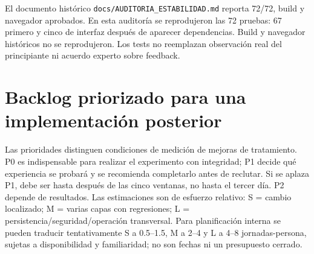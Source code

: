\documentclass[11pt,a4paper]{report}
\begin{document}
El documento histórico \nolinkurl{docs/AUDITORIA_ESTABILIDAD.md} reporta 72/72, build y navegador aprobados. En esta auditoría se reprodujeron las 72 pruebas: 67 primero y cinco de interfaz después de aparecer dependencias. Build y navegador históricos no se reprodujeron. Los tests no reemplazan observación real del principiante ni acuerdo experto sobre feedback.

\chapter{Backlog priorizado para una implementación posterior}
\label{ch:backlog}
Las prioridades distinguen condiciones de medición de mejoras de tratamiento. P0 es indispensable para realizar el experimento con integridad; P1 decide qué experiencia se probará y se recomienda completarlo antes de reclutar. Si se aplaza P1, debe ser hasta después de las cinco ventanas, no hasta el tercer día. P2 depende de resultados. Las estimaciones son de esfuerzo relativo: S = cambio localizado; M = varias capas con regresiones; L = persistencia/seguridad/operación transversal. Para planificación interna se pueden traducir tentativamente S a 0.5--1.5, M a 2--4 y L a 4--8 jornadas-persona, sujetas a disponibilidad y familiaridad; no son fechas ni un presupuesto cerrado.
\end{document}
